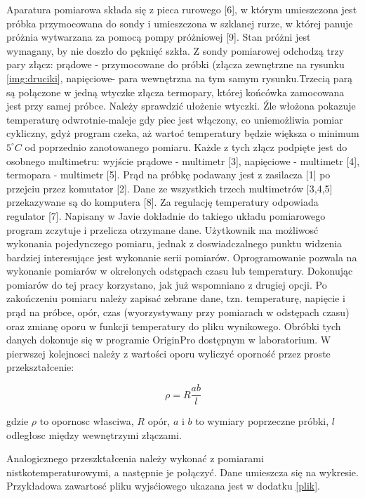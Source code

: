 \documentclass[a4paper,12pt]{article}
\numberwithin{equation}{section}
\begin{document}
Aparatura pomiarowa składa się z pieca rurowego [6], w którym umieszczona jest próbka przymocowana do sondy i 
umieszczona w szklanej rurze, w której panuje próżnia wytwarzana za pomocą pompy próżniowej [9]. Stan próżni jest 
wymagany, by nie doszło do pęknięć szkła. Z sondy pomiarowej odchodzą trzy pary złącz: prądowe -  przymocowane do próbki 
(złącza zewnętrzne na rysunku \ref{img:druciki}, napięciowe- para wewnętrzna na tym samym rysunku.Trzecią parą są 
połączone w jedną wtyczke 
złącza termopary, której końcówka zamocowana jest przy samej próbce. Należy sprawdzić ułożenie wtyczki. Źle włożona 
pokazuje temperaturę odwrotnie-maleje gdy piec jest włączony, co uniemożliwia pomiar cykliczny, gdyż program czeka, 
aż wartoć temperatury będzie większa o minimum $5^{\circ}C$ od poprzednio zanotowanego pomiaru. Każde z tych 
złącz podpięte jest do osobnego 
multimetru: wyjście prądowe - multimetr [3],  napięciowe - multimetr [4], termopara - multimetr [5]. Prąd na próbkę podawany jest 
z zasilacza [1] po przejciu przez komutator [2]. Dane ze wszystkich trzech 
multimetrów [3,4,5]  przekazywane są do komputera [8]. Za regulację temperatury odpowiada regulator [7].  Napisany w Javie 
dokładnie do takiego układu pomiarowego program 
zczytuje i przelicza otrzymane dane. Użytkownik ma możliwosć wykonania pojedynczego pomiaru, jednak z 
doswiadczalnego punktu widzenia bardziej interesujące jest wykonanie serii pomiarów. Oprogramowanie pozwala na 
wykonanie pomiarów w okrelonych odstępach czasu lub temperatury. Dokonując pomiarów do tej pracy korzystano, jak 
już wspomniano z 
drugiej opcji. Po zakończeniu pomiaru należy zapisać zebrane dane, tzn. temperaturę, napięcie i prąd na próbce, 
opór, czas (wyorzystywany przy pomiarach w odstępach czasu) oraz zmianę oporu w funkcji temperatury do pliku 
wynikowego. Obróbki tych danych dokonuje się w programie OriginPro  dostępnym w laboratorium. W pierwszej 
kolejnosci należy z wartości oporu wyliczyć oporność  przez proste przekształcenie:

  \begin{equation}
    \rho=R\frac{ab}{l}
    \label{opornosc}
  \end{equation}

gdzie $\rho$ to opornosc własciwa, $R$ opór, $a$ i $b$ to wymiary poprzeczne próbki, $l$ odległosc między 
wewnętrzymi złączami. 


 Analogicznego przeszktałcenia należy wykonać z pomiarami nistkotemperaturowymi, a następnie je połączyć. Dane umieszcza się 
na wykresie. Przykładowa zawartosć pliku wyjsćiowego ukazana jest w dodatku  \ref{plik}.
\end{document}
